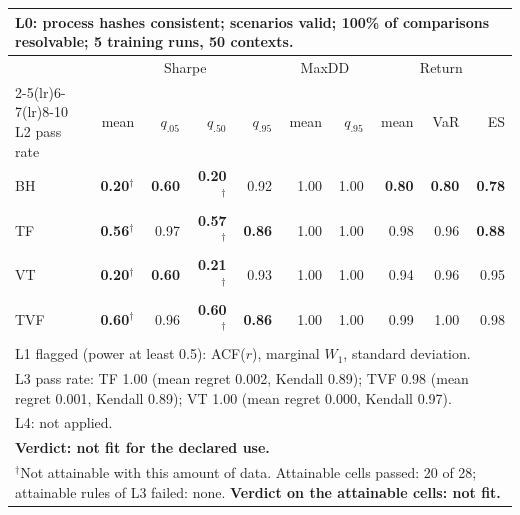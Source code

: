 \begin{tabular}{lrrrrrrrrr}
\toprule
\multicolumn{10}{p{13.5cm}}{L0: process hashes consistent; scenarios valid; 100\% of comparisons resolvable; 5 training runs, 50 contexts.} \\
\midrule
 & \multicolumn{4}{c}{Sharpe} & \multicolumn{2}{c}{MaxDD} & \multicolumn{3}{c}{Return} \\
\cmidrule(lr){2-5}\cmidrule(lr){6-7}\cmidrule(lr){8-10}
L2 pass rate & mean & $q_{.05}$ & $q_{.50}$ & $q_{.95}$ & mean & $q_{.95}$ & mean & VaR & ES \\
\midrule
BH & \textbf{0.20}$^{\dagger}$ & \textbf{0.60} & \textbf{0.20}$^{\dagger}$ & 0.92 & 1.00 & 1.00 & \textbf{0.80} & \textbf{0.80} & \textbf{0.78} \\
TF & \textbf{0.56}$^{\dagger}$ & 0.97 & \textbf{0.57}$^{\dagger}$ & \textbf{0.86} & 1.00 & 1.00 & 0.98 & 0.96 & \textbf{0.88} \\
VT & \textbf{0.20}$^{\dagger}$ & \textbf{0.60} & \textbf{0.21}$^{\dagger}$ & 0.93 & 1.00 & 1.00 & 0.94 & 0.96 & 0.95 \\
TVF & \textbf{0.60}$^{\dagger}$ & 0.96 & \textbf{0.60}$^{\dagger}$ & \textbf{0.86} & 1.00 & 1.00 & 0.99 & 1.00 & 0.98 \\
\midrule
\multicolumn{10}{p{13.5cm}}{L1 flagged (power at least 0.5): ACF($r$), marginal $W_1$, standard deviation.} \\
\multicolumn{10}{p{13.5cm}}{L3 pass rate: TF 1.00 (mean regret 0.002, Kendall 0.89); TVF 0.98 (mean regret 0.001, Kendall 0.89); VT 1.00 (mean regret 0.000, Kendall 0.97).} \\
\multicolumn{10}{p{13.5cm}}{L4: not applied.} \\
\multicolumn{10}{p{13.5cm}}{\textbf{Verdict: not fit for the declared use.}} \\
\multicolumn{10}{p{13.5cm}}{$^{\dagger}$Not attainable with this amount of data. Attainable cells passed: 20 of 28; attainable rules of L3 failed: none. \textbf{Verdict on the attainable cells: not fit.}} \\
\bottomrule
\end{tabular}
